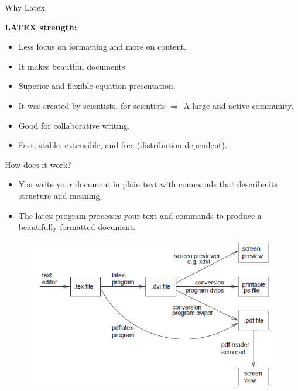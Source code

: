 \documentclass{bredelebeamer}
\begin{document}
 \begin{frame}[<+->]{Why Latex}
   	
   	\begin{exampleblock}{\textbf {LATEX strength:}}
   		\begin{itemize}
   			\item Less focus on formatting and more on content.
   			\item It makes beautiful documents.
   			\item Superior and flexible equation presentation.
   			\item It was created by scientists, for scientists $\Rightarrow$ A large and active community.
   			\item Good for collaborative writing.
   			\item Fast, stable, extensible, and free (distribution dependent).
   		\end{itemize}
   	\end{exampleblock}
   \end{frame}
   

   \begin{frame}{How does it work?}
   	
   	
   	\begin{itemize}
   		\item You write your document in plain text with commands that describe its structure and meaning.
   		\item  The latex program processes your text and commands to produce a beautifully formatted document.
   	\end{itemize}
   	\pause
   	\begin{figure}
   		\includegraphics[scale=0.45]{images/latexhowthis}
   	\end{figure}
   \end{frame}
\end{document}
